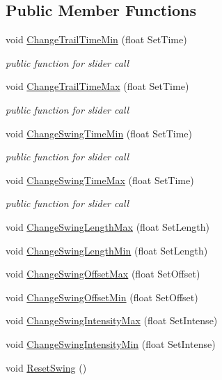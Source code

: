 \subsection*{Public Member Functions}
\begin{DoxyCompactItemize}
\item 
void \mbox{\hyperlink{class_hammer_testing_abaa1e4c02505188080958aaf1283b779}{Change\+Trail\+Time\+Min}} (float Set\+Time)
\begin{DoxyCompactList}\small\item\em public function for slider call \end{DoxyCompactList}\item 
void \mbox{\hyperlink{class_hammer_testing_a36e4790346baa674f372bc75a5108fef}{Change\+Trail\+Time\+Max}} (float Set\+Time)
\begin{DoxyCompactList}\small\item\em public function for slider call \end{DoxyCompactList}\item 
void \mbox{\hyperlink{class_hammer_testing_a6927a1845828bb873e10168e6de15ee9}{Change\+Swing\+Time\+Min}} (float Set\+Time)
\begin{DoxyCompactList}\small\item\em public function for slider call \end{DoxyCompactList}\item 
void \mbox{\hyperlink{class_hammer_testing_a895ff7ed709508ccb4b6c500d073f8b6}{Change\+Swing\+Time\+Max}} (float Set\+Time)
\begin{DoxyCompactList}\small\item\em public function for slider call \end{DoxyCompactList}\item 
void \mbox{\hyperlink{class_hammer_testing_adb087c5946ba11a6399f156e9685fc83}{Change\+Swing\+Length\+Max}} (float Set\+Length)
\item 
void \mbox{\hyperlink{class_hammer_testing_a02e37ef618b93f28388a20cd1c0d2b99}{Change\+Swing\+Length\+Min}} (float Set\+Length)
\item 
void \mbox{\hyperlink{class_hammer_testing_ae67d42f241c31fe41be12392f08d6d9d}{Change\+Swing\+Offset\+Max}} (float Set\+Offset)
\item 
void \mbox{\hyperlink{class_hammer_testing_a9abdafe3c6675aff4094363495f7251e}{Change\+Swing\+Offset\+Min}} (float Set\+Offset)
\item 
void \mbox{\hyperlink{class_hammer_testing_aaca7b5724567ca533c838d55c25333b3}{Change\+Swing\+Intensity\+Max}} (float Set\+Intense)
\item 
void \mbox{\hyperlink{class_hammer_testing_aa17c21326fabf011c3ac5332d4ff0123}{Change\+Swing\+Intensity\+Min}} (float Set\+Intense)
\item 
void \mbox{\hyperlink{class_hammer_testing_a028b00573aa72094e4c3adc5dd78e349}{Reset\+Swing}} ()
\end{DoxyCompactItemize}
